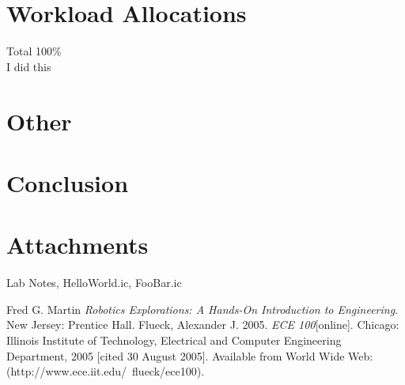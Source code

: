 \documentclass[a4paper, 11pt]{article}
\begin{document}
\section*{Workload Allocations}
Total 100\% \\
I did this

\section*{Other}
\lipsum[7]

\section*{Conclusion}
\lipsum[6]


\section*{Attachments}
Lab Notes, HelloWorld.ic, FooBar.ic

\begin{thebibliography}{9}
 Fred G. Martin \emph{Robotics Explorations: A Hands-On Introduction to Engineering}. New Jersey: Prentice Hall.
  Flueck, Alexander J. 2005. \emph{ECE 100}[online]. Chicago: Illinois Institute of Technology, Electrical and Computer Engineering Department, 2005 [cited 30 August 2005]. Available from World Wide Web: (http://www.ece.iit.edu/~flueck/ece100).
\end{thebibliography}
\end{document}
